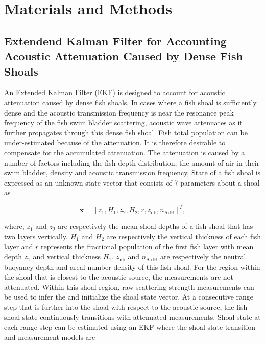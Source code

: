 \documentclass[technicalnote,oneauthor,latex,dvi2pdf,10pt,a4paper]{Definitions/mdpi}
\begin{document}


\section{Materials and Methods}
\subsection{Extendend Kalman Filter for Accounting Acoustic Attenuation Caused by Dense Fish Shoals}
An Extended Kalman Filter (EKF) is designed to account for acoustic attenuation caused by dense fish shoals. 
In cases where a fish shoal is sufficiently dense and the acoustic transmission frequency is near the resonance peak frequency of the fish swim bladder scattering, acoustic wave attenuates as it further propagates through this dense fish shoal. 
Fish total population can be under-estimated because of the attenuation.
It is therefore desirable to compensate for the accumulated attenuation.
The attenuation is caused by a number of factors including the fish depth distribution, the amount of air in their swim bladder, density and acoustic transmission frequency, 
State of a fish shoal is expressed as an unknown state vector that consists of 7 parameters about a shoal as

\begin{equation}
\label{eq:stateVec}
\mathbf{x} = \left[z_1, H_1, z_2, H_2, r, z_\text{nb}, n_\text{AdB}\right]^{T},
\end{equation}

\noindent where, $z_1$ and $z_2$ are respectively the mean shoal depths of a fish shoal that has two layers vertically. 
$H_1$ and $H_2$ are respectively the vertical thickness of each fish layer and $r$ represents the fractional population of the first fish layer with mean depth $z_1$ and vertical thickness $H_1$.
$z_\text{nb}$ and $n_\text{A,dB}$ are respectively the neutral buoyancy depth and areal number density of this fish shoal.
For the region within the shoal that is closest to the acoustic source, the measurements are not attenuated. 
Within this shoal region, raw scattering strength measurements can be used to infer the and initialize the shoal state vector.
At a consecutive range step that is further into the shoal with respect to the acoustic source, the fish shoal state continuously transitions with attenuated measurements.
Shoal state at each range step can be estimated using an EKF where the shoal state transition and measurement models are 
\end{document}

